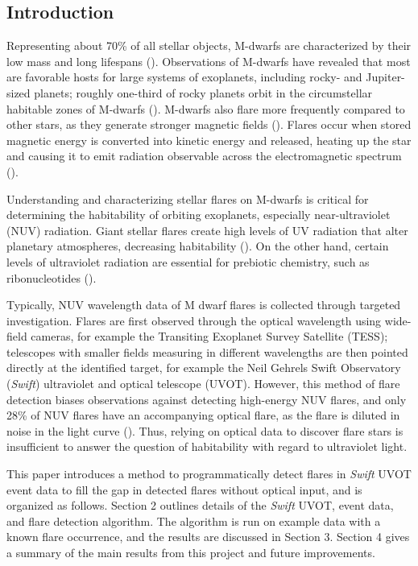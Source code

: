 \documentclass{article}
\begin{document}
\begin{multicols}{2}

\section{Introduction}

Representing about 70\% of all stellar objects, M-dwarfs are characterized by their low mass and long lifespans (\cite{bochanski}). Observations of M-dwarfs have revealed that most are favorable hosts for large systems of exoplanets, including rocky- and Jupiter-sized planets; roughly one-third of rocky planets orbit in the circumstellar habitable zones of M-dwarfs (\cite{aomawa}). M-dwarfs also flare more frequently compared to other stars, as they generate stronger magnetic fields (\cite{shulyak}). Flares occur when stored magnetic energy is converted into kinetic energy and released, heating up the star and causing it to emit radiation observable across the electromagnetic spectrum (\cite{kowalski}). 

Understanding and characterizing stellar flares on M-dwarfs is critical for determining the habitability of orbiting exoplanets, especially near-ultraviolet (NUV) radiation. Giant stellar flares create high levels of UV radiation that alter planetary atmospheres, decreasing habitability (\cite{howard}). On the other hand, certain levels of ultraviolet radiation are essential for prebiotic chemistry, such as ribonucleotides (\cite{ranjan}). 

Typically, NUV wavelength data of M dwarf flares is collected through targeted investigation. Flares are first observed through the optical wavelength using wide-field cameras, for example the Transiting Exoplanet Survey Satellite (TESS); telescopes with smaller fields measuring in different wavelengths are then pointed directly at the identified target, for example the Neil Gehrels Swift Observatory (\textit{Swift}) ultraviolet and optical telescope (UVOT). However, this method of flare detection biases observations against detecting high-energy NUV flares, and only 28\% of NUV flares have an accompanying optical flare, as the flare is diluted in noise in the light curve (\cite{paudel}). Thus, relying on optical data to discover flare stars is insufficient to answer the question of habitability with regard to ultraviolet light. 

This paper introduces a method to programmatically detect flares in \textit{Swift} UVOT event data to fill the gap in detected flares without optical input, and is organized as follows. Section 2 outlines details of the \textit{Swift} UVOT, event data, and flare detection algorithm. The algorithm is run on example data with a known flare occurrence, and the results are discussed in Section 3. Section 4 gives a summary of the main results from this project and future improvements. 


\end{multicols}
\end{document}
